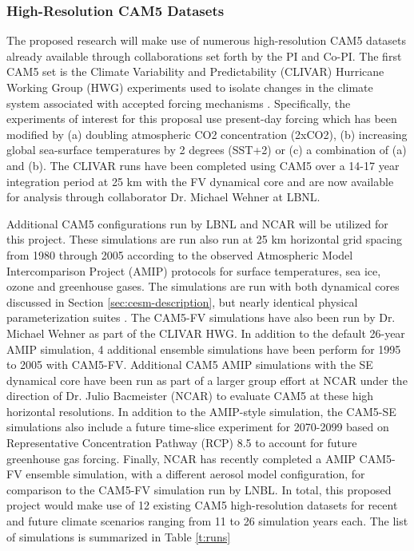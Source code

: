 \documentclass[11pt]{article}
\begin{document}
\subsubsection{High-Resolution CAM5 Datasets} \label{sec:CAM-data} 

The proposed research will make use of numerous high-resolution CAM5 datasets already available through collaborations set forth by the PI and Co-PI. The first CAM5 set is the Climate Variability and Predictability (CLIVAR) Hurricane Working Group (HWG) experiments used to isolate changes in the climate system associated with accepted forcing mechanisms \citep{Wehner2015}.  Specifically, the experiments of interest for this proposal use present-day forcing which has been modified by (a) doubling atmospheric CO2 concentration (2xCO2), (b) increasing global sea-surface temperatures by 2 degrees (SST+2) or (c) a combination of (a) and (b).  The CLIVAR runs have been completed using CAM5 over a 14-17 year integration period at 25 km with the FV dynamical core and are now available for analysis through collaborator Dr. Michael Wehner at LBNL.

Additional CAM5 configurations run by LBNL and NCAR will be utilized for this project. These simulations are run also run at 25 km horizontal grid spacing from 1980 through 2005 according to the observed Atmospheric Model Intercomparison Project (AMIP) protocols \citep{Gates1992,Gates1999} for surface temperatures, sea ice, ozone and greenhouse gases. The simulations are run with both dynamical cores discussed in Section \ref{sec:cesm-description}, but nearly identical physical parameterization suites \citep{RBNetal2010NCAR}. The CAM5-FV simulations have also been run by Dr. Michael Wehner as part of the CLIVAR HWG. In addition to the default 26-year AMIP simulation, 4 additional ensemble simulations have been perform for 1995 to 2005 with CAM5-FV. Additional CAM5 AMIP simulations with the SE dynamical core have been run as part of a larger group effort at NCAR under the direction of Dr. Julio Bacmeister (NCAR) to evaluate CAM5 at these high horizontal resolutions. In addition to the AMIP-style simulation, the CAM5-SE simulations also include a future time-slice experiment for 2070-2099 based on Representative Concentration Pathway (RCP) 8.5 to account for future greenhouse gas forcing. Finally, NCAR has recently completed a AMIP CAM5-FV ensemble simulation, with a different aerosol model configuration, for comparison to the CAM5-FV simulation run by LNBL.  In total, this proposed project would make use of 12 existing CAM5 high-resolution datasets for recent and future climate scenarios ranging from 11 to 26 simulation years each.  The list of simulations is summarized in Table \ref{t:runs}
\end{document}
